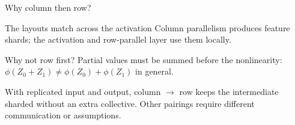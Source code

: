 \documentclass[handout]{beamer}
\begin{document}
\begin{frame}{Why column then row?}
  \begin{block}{The layouts match across the activation}
    Column parallelism produces feature shards; the activation and row-parallel layer use them locally.
  \end{block}
  \vspace{5pt}
  \begin{alertblock}{Why not row first?}
    Partial values must be summed before the nonlinearity: $\phi(Z_0+Z_1)\ne\phi(Z_0)+\phi(Z_1)$ in general.
  \end{alertblock}
  \vfill
  \small With replicated input and output, column $\to$ row keeps the intermediate sharded without an extra collective. Other pairings require different communication or assumptions.
\end{frame}
\end{document}
